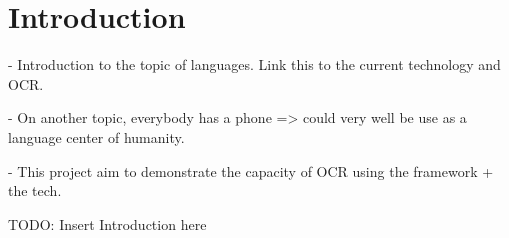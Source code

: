 
\chapter{Introduction}

- Introduction to the topic of languages. Link this to the current technology and OCR. 



- On another topic, everybody has a phone => could very well be use as a language center of humanity.

- This project aim to demonstrate the capacity of OCR using the framework + the tech.

TODO: Insert Introduction here

\clearpage